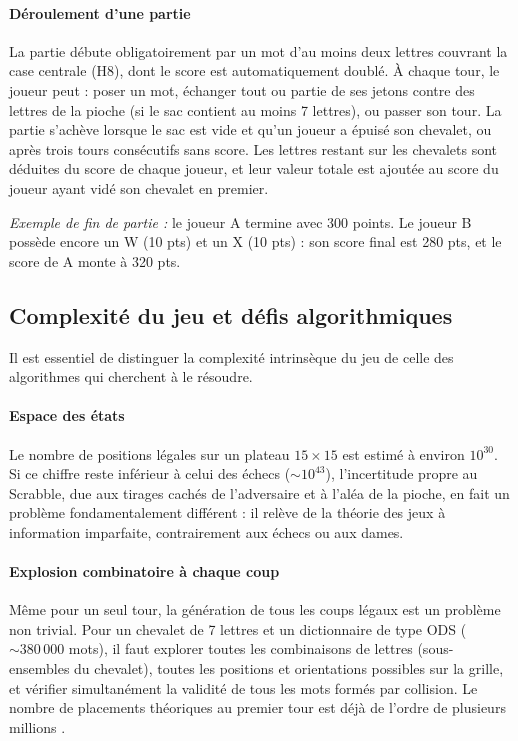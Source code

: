 \documentclass[a4paper]{article}
\begin{document}
    \paragraph{Déroulement d'une partie}
    La partie débute obligatoirement par un mot d'au moins deux lettres couvrant la case centrale (H8), dont le score est automatiquement doublé. À chaque tour, le joueur peut : poser un mot, échanger tout ou partie de ses jetons contre des lettres de la pioche (si le sac contient au moins 7 lettres), ou passer son tour. La partie s'achève lorsque le sac est vide et qu'un joueur a épuisé son chevalet, ou après trois tours consécutifs sans score. Les lettres restant sur les chevalets sont déduites du score de chaque joueur, et leur valeur totale est ajoutée au score du joueur ayant vidé son chevalet en premier.

    \textit{Exemple de fin de partie :} le joueur A termine avec 300 points. Le joueur B possède encore un W (10 pts) et un X (10 pts) : son score final est 280 pts, et le score de A monte à 320 pts.

    \subsection{Complexité du jeu et défis algorithmiques}
    Il est essentiel de distinguer la complexité intrinsèque du jeu de celle des algorithmes qui cherchent à le résoudre.

    \paragraph{Espace des états}
    Le nombre de positions légales sur un plateau $15 \times 15$ est estimé à environ $10^{30}$. Si ce chiffre reste inférieur à celui des échecs ($\sim 10^{43}$), l'incertitude propre au Scrabble, due aux tirages cachés de l'adversaire et à l'aléa de la pioche, en fait un problème fondamentalement différent : il relève de la théorie des jeux à information imparfaite, contrairement aux échecs ou aux dames.

	\paragraph{Explosion combinatoire à chaque coup}
    Même pour un seul tour, la génération de tous les coups légaux est un problème non trivial. Pour un chevalet de 7 lettres et un dictionnaire de type ODS ($\sim 380\,000$ mots), il faut explorer toutes les combinaisons de lettres (sous-ensembles du chevalet), toutes les positions et orientations possibles sur la grille, et vérifier simultanément la validité de tous les mots formés par collision. Le nombre de placements théoriques au premier tour est déjà de l'ordre de plusieurs millions \cite{10.1145/42411.42420}.
\end{document}
